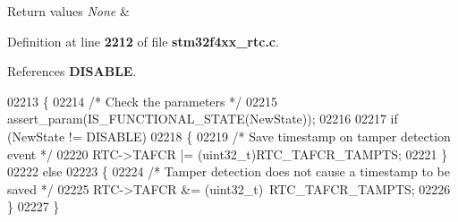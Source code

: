 \begin{DoxyRetVals}{Return values}
{\em None} & \\
\hline
\end{DoxyRetVals}


Definition at line \textbf{ 2212} of file \textbf{ stm32f4xx\+\_\+rtc.\+c}.



References \textbf{ D\+I\+S\+A\+B\+LE}.


\begin{DoxyCode}
02213 \{
02214   \textcolor{comment}{/* Check the parameters */}
02215   assert_param(IS_FUNCTIONAL_STATE(NewState));
02216    
02217   \textcolor{keywordflow}{if} (NewState != DISABLE)
02218   \{
02219     \textcolor{comment}{/* Save timestamp on tamper detection event */}
02220     RTC->TAFCR |= (uint32\_t)RTC_TAFCR_TAMPTS;
02221   \}
02222   \textcolor{keywordflow}{else}
02223   \{
02224     \textcolor{comment}{/* Tamper detection does not cause a timestamp to be saved */}
02225     RTC->TAFCR &= (uint32\_t)~RTC_TAFCR_TAMPTS;    
02226   \}
02227 \}
\end{DoxyCode}
